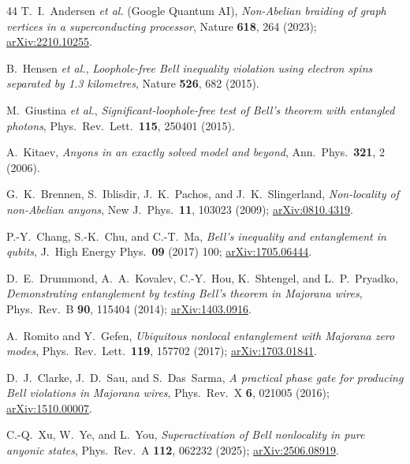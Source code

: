 \documentclass[aps,pra,twocolumn,superscriptaddress,longbibliography,floatfix,nofootinbib]{revtex4-2}
\begin{document}
\begin{thebibliography}{44}
T.~I.~Andersen \emph{et al.} (Google Quantum AI),
\textit{Non-Abelian braiding of graph vertices in a
superconducting processor},
Nature \textbf{618}, 264 (2023);
\href{https://arxiv.org/abs/2210.10255}{arXiv:2210.10255}.


B.~Hensen \emph{et al.},
\textit{Loophole-free Bell inequality violation using electron
spins separated by 1.3 kilometres},
Nature \textbf{526}, 682 (2015).

M.~Giustina \emph{et al.},
\textit{Significant-loophole-free test of Bell's theorem with
entangled photons},
Phys.\ Rev.\ Lett.\ \textbf{115}, 250401 (2015).


A.~Kitaev,
\textit{Anyons in an exactly solved model and beyond},
Ann.\ Phys.\ \textbf{321}, 2 (2006).



G.~K.~Brennen, S.~Iblisdir, J.~K.~Pachos, and J.~K.~Slingerland,
\textit{Non-locality of non-Abelian anyons},
New J.\ Phys.\ \textbf{11}, 103023 (2009);
\href{https://arxiv.org/abs/0810.4319}{arXiv:0810.4319}.

P.-Y.~Chang, S.-K.~Chu, and C.-T.~Ma,
\textit{Bell's inequality and entanglement in qubits},
J.\ High Energy Phys.\ \textbf{09} (2017) 100;
\href{https://arxiv.org/abs/1705.06444}{arXiv:1705.06444}.

D.~E.~Drummond, A.~A.~Kovalev, C.-Y.~Hou, K.~Shtengel, and L.~P.~Pryadko,
\textit{Demonstrating entanglement by testing Bell's theorem in Majorana wires},
Phys.\ Rev.\ B \textbf{90}, 115404 (2014);
\href{https://arxiv.org/abs/1403.0916}{arXiv:1403.0916}.

A.~Romito and Y.~Gefen,
\textit{Ubiquitous nonlocal entanglement with Majorana zero modes},
Phys.\ Rev.\ Lett.\ \textbf{119}, 157702 (2017);
\href{https://arxiv.org/abs/1703.01841}{arXiv:1703.01841}.

D.~J.~Clarke, J.~D.~Sau, and S.~Das~Sarma,
\textit{A practical phase gate for producing Bell violations in Majorana wires},
Phys.\ Rev.\ X \textbf{6}, 021005 (2016);
\href{https://arxiv.org/abs/1510.00007}{arXiv:1510.00007}.

C.-Q.~Xu, W.~Ye, and L.~You,
\textit{Superactivation of Bell nonlocality in pure anyonic states},
Phys.\ Rev.\ A \textbf{112}, 062232 (2025);
\href{https://arxiv.org/abs/2506.08919}{arXiv:2506.08919}.


\end{thebibliography}
\end{document}
